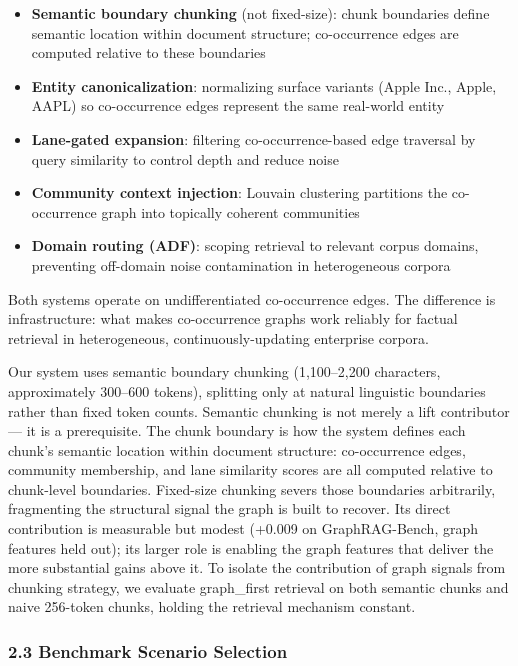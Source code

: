 \begin{itemize}
\tightlist
\item
  \textbf{Semantic boundary chunking} (not fixed-size): chunk boundaries define semantic location within document structure; co-occurrence edges are computed relative to these boundaries
\item
  \textbf{Entity canonicalization}: normalizing surface variants (Apple Inc., Apple, AAPL) so co-occurrence edges represent the same real-world entity
\item
  \textbf{Lane-gated expansion}: filtering co-occurrence-based edge traversal by query similarity to control depth and reduce noise
\item
  \textbf{Community context injection}: Louvain clustering partitions the co-occurrence graph into topically coherent communities
\item
  \textbf{Domain routing (ADF)}: scoping retrieval to relevant corpus domains, preventing off-domain noise contamination in heterogeneous corpora
\end{itemize}

Both systems operate on undifferentiated co-occurrence edges. The difference is infrastructure: what makes co-occurrence graphs work reliably for factual retrieval in heterogeneous, continuously-updating enterprise corpora.

Our system uses semantic boundary chunking (1,100--2,200 characters, approximately 300--600 tokens), splitting only at natural linguistic boundaries rather than fixed token counts. Semantic chunking is not merely a lift contributor --- it is a prerequisite. The chunk boundary is how the system defines each chunk's semantic location within document structure: co-occurrence edges, community membership, and lane similarity scores are all computed relative to chunk-level boundaries. Fixed-size chunking severs those boundaries arbitrarily, fragmenting the structural signal the graph is built to recover. Its direct contribution is measurable but modest (+0.009 on GraphRAG-Bench, graph features held out); its larger role is enabling the graph features that deliver the more substantial gains above it. To isolate the contribution of graph signals from chunking strategy, we evaluate graph\_first retrieval on both semantic chunks and naive 256-token chunks, holding the retrieval mechanism constant.

\subsubsection{2.3 Benchmark Scenario Selection}\label{benchmark-scenario-selection}

